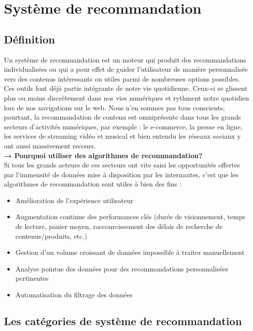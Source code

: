 \section{Système de recommandation}

\subsection{Définition}

	Un système de recommandation est un moteur qui produit des recommandations individualisées ou qui a pour effet de guider l’utilisateur de manière personnalisée vers des contenus  intéressants ou utiles parmi de nombreuses options possibles. Ces outils font déjà partie intégrante de notre vie quotidienne. Ceux-ci se glissent plus ou moins discrètement dans nos vies numériques et rythment notre quotidien lors de nos navigations sur le web. Nous n’en sommes pas tous conscients, pourtant, la recommandation de contenu est omniprésente dans tous les grands secteurs d’activités numériques, par exemple : le e-commerce, la presse en ligne, les services de streaming vidéo et musical et bien entendu les réseaux sociaux y ont aussi massivement recours. \\

  	\textbf{→  Pourquoi utiliser des algorithmes de recommandation?} \\
	Si tous les grands acteurs de ces secteurs ont vite saisi les opportunités offertes par l’immensité de données mise à disposition par les internautes, c’est que les algorithmes de recommandation sont utiles à bien des fins : 
   \begin{itemize}
	\item Amélioration de l’expérience utilisateur 
	\item Augmentation continue des performances clés (durée de visionnement, temps de lecture, panier moyen, raccourcissement des délais de recherche de contenus/produits, etc.)
	\item Gestion d’un volume croissant de données impossible à traiter manuellement 
	\item Analyse pointue des données pour des recommandations personnalisées pertinentes
	\item Automatisation du filtrage des données
   \end{itemize}

\subsection{Les catégories de système de recommandation  }

